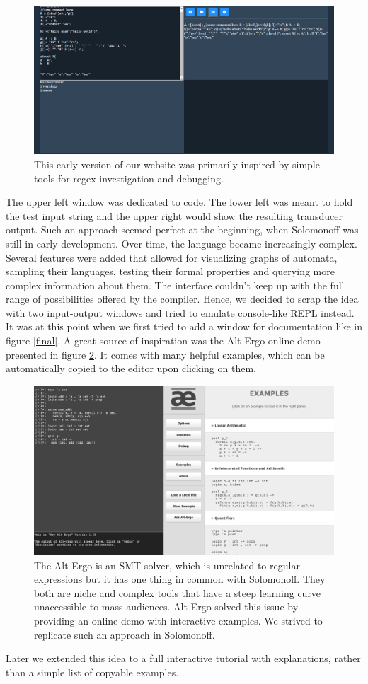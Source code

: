 \begin{figure}
\includegraphics[scale=0.2]{web3.png}
\caption{This early version of our website was primarily inspired by simple tools for regex investigation and debugging.}
\label{stage3}
\end{figure}
The upper left window was dedicated to code. The lower left was meant to hold the test input string and the upper right would show the resulting transducer output. Such an approach seemed perfect at the beginning, when Solomonoff was still in early development. Over time, the language became increasingly complex. Several features were added that allowed for visualizing graphs of automata, sampling their languages, testing their formal properties and querying more complex information about them. The interface couldn't keep up with the full range of possibilities offered by the compiler. Hence, we decided to scrap the idea with two input-output windows and tried to emulate console-like REPL instead. 
It was at this point when we first tried to add a window for documentation like in figure \ref{final}. A great source of inspiration was the Alt-Ergo online demo presented in figure \ref{altergo}. It comes with many helpful examples, which can be automatically copied to the editor upon clicking on them.
\begin{figure}
\includegraphics[scale=0.3]{alt-ergo.png}
\caption{The Alt-Ergo is an SMT solver, which is unrelated to regular expressions but it has one thing in common with Solomonoff. They both are niche and complex tools that have a steep learning curve unaccessible to mass audiences. Alt-Ergo solved this issue by providing an online demo with interactive examples. We strived to replicate such an approach in Solomonoff.}
\label{altergo}
\end{figure}
Later we extended this idea to a full interactive tutorial with explanations, rather than a simple list of copyable examples. 

